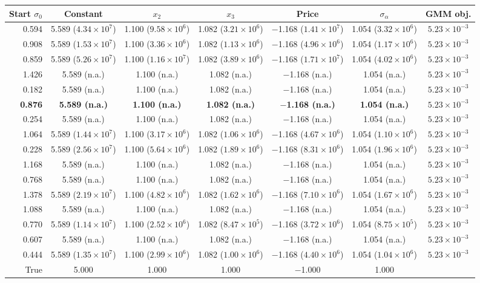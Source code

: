 \begin{tabular}{rcccccc}
\toprule
Start $\sigma_0$ & Constant & $x_2$ & $x_3$ & Price & $\sigma_\alpha$ & GMM obj. \\
\midrule
0.594 & 5.589 ($4.34\times10^{7}$) & 1.100 ($9.58\times10^{6}$) & 1.082 ($3.21\times10^{6}$) & $-$1.168 ($1.41\times10^{7}$) & 1.054 ($3.32\times10^{6}$) & $5.23\times10^{-3}$ \\
0.908 & 5.589 ($1.53\times10^{7}$) & 1.100 ($3.36\times10^{6}$) & 1.082 ($1.13\times10^{6}$) & $-$1.168 ($4.96\times10^{6}$) & 1.054 ($1.17\times10^{6}$) & $5.23\times10^{-3}$ \\
0.859 & 5.589 ($5.26\times10^{7}$) & 1.100 ($1.16\times10^{7}$) & 1.082 ($3.89\times10^{6}$) & $-$1.168 ($1.71\times10^{7}$) & 1.054 ($4.02\times10^{6}$) & $5.23\times10^{-3}$ \\
1.426 & 5.589 (n.a.) & 1.100 (n.a.) & 1.082 (n.a.) & $-$1.168 (n.a.) & 1.054 (n.a.) & $5.23\times10^{-3}$ \\
0.182 & 5.589 (n.a.) & 1.100 (n.a.) & 1.082 (n.a.) & $-$1.168 (n.a.) & 1.054 (n.a.) & $5.23\times10^{-3}$ \\
\textbf{0.876} & \textbf{5.589 (n.a.)} & \textbf{1.100 (n.a.)} & \textbf{1.082 (n.a.)} & \textbf{$-$1.168 (n.a.)} & \textbf{1.054 (n.a.)} & \textbf{$5.23\times10^{-3}$} \\
0.254 & 5.589 (n.a.) & 1.100 (n.a.) & 1.082 (n.a.) & $-$1.168 (n.a.) & 1.054 (n.a.) & $5.23\times10^{-3}$ \\
1.064 & 5.589 ($1.44\times10^{7}$) & 1.100 ($3.17\times10^{6}$) & 1.082 ($1.06\times10^{6}$) & $-$1.168 ($4.67\times10^{6}$) & 1.054 ($1.10\times10^{6}$) & $5.23\times10^{-3}$ \\
0.228 & 5.589 ($2.56\times10^{7}$) & 1.100 ($5.64\times10^{6}$) & 1.082 ($1.89\times10^{6}$) & $-$1.168 ($8.31\times10^{6}$) & 1.054 ($1.96\times10^{6}$) & $5.23\times10^{-3}$ \\
1.168 & 5.589 (n.a.) & 1.100 (n.a.) & 1.082 (n.a.) & $-$1.168 (n.a.) & 1.054 (n.a.) & $5.23\times10^{-3}$ \\
0.768 & 5.589 (n.a.) & 1.100 (n.a.) & 1.082 (n.a.) & $-$1.168 (n.a.) & 1.054 (n.a.) & $5.23\times10^{-3}$ \\
1.378 & 5.589 ($2.19\times10^{7}$) & 1.100 ($4.82\times10^{6}$) & 1.082 ($1.62\times10^{6}$) & $-$1.168 ($7.10\times10^{6}$) & 1.054 ($1.67\times10^{6}$) & $5.23\times10^{-3}$ \\
1.088 & 5.589 (n.a.) & 1.100 (n.a.) & 1.082 (n.a.) & $-$1.168 (n.a.) & 1.054 (n.a.) & $5.23\times10^{-3}$ \\
0.770 & 5.589 ($1.14\times10^{7}$) & 1.100 ($2.52\times10^{6}$) & 1.082 ($8.47\times10^{5}$) & $-$1.168 ($3.72\times10^{6}$) & 1.054 ($8.75\times10^{5}$) & $5.23\times10^{-3}$ \\
0.607 & 5.589 (n.a.) & 1.100 (n.a.) & 1.082 (n.a.) & $-$1.168 (n.a.) & 1.054 (n.a.) & $5.23\times10^{-3}$ \\
0.444 & 5.589 ($1.35\times10^{7}$) & 1.100 ($2.99\times10^{6}$) & 1.082 ($1.00\times10^{6}$) & $-$1.168 ($4.40\times10^{6}$) & 1.054 ($1.04\times10^{6}$) & $5.23\times10^{-3}$ \\
\midrule
True & 5.000 & 1.000 & 1.000 & $-$1.000 & 1.000 &  \\
\bottomrule
\end{tabular}
